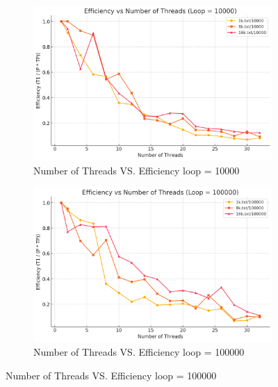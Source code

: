 \documentclass[letterpaper,12pt]{article}
\theoremstyle{remark}
\begin{document}
\begin{figure}[H]
    \centering
    \begin{subfigure}[t]{0.48\textwidth}  %
        \centering
        \includegraphics[width=\textwidth]{efficiency10000.png}
        \caption{Number of Threads VS. Efficiency loop = 10000}
        \label{fig:ThreadVsEfficiency}
    \end{subfigure}
    \hfill  %
    \begin{subfigure}[t]{0.48\textwidth}  %
        \centering
        \includegraphics[width=\textwidth]{efficiency100000.png}
        \caption{Number of Threads VS. Efficiency loop = 100000}
        \label{fig:ThreadVsEfficiency}
    \end{subfigure}
   \label{fig:ThreadVsEfficiency}
\end{figure}
\hfill  %
\end{document}
